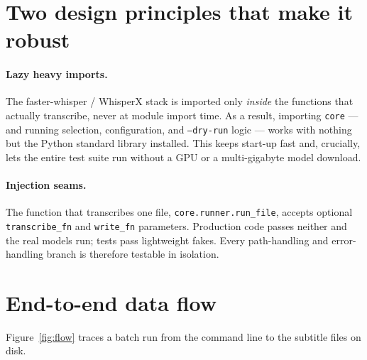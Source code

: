 \documentclass[11pt,a4paper]{report}
\newcommand{\code}[1]{\texttt{\small #1}}
\begin{document}
\section{Two design principles that make it robust}

\paragraph{Lazy heavy imports.} The faster-whisper / WhisperX stack is imported
only \emph{inside} the functions that actually transcribe, never at module import
time. As a result, importing \texttt{core} --- and running selection, configuration,
and \code{--dry-run} logic --- works with nothing but the Python standard library
installed. This keeps start-up fast and, crucially, lets the entire test suite run
without a GPU or a multi-gigabyte model download.

\paragraph{Injection seams.} The function that transcribes one file,
\code{core.runner.run\_file}, accepts optional \code{transcribe\_fn} and
\code{write\_fn} parameters. Production code passes neither and the real models
run; tests pass lightweight fakes. Every path-handling and error-handling branch
is therefore testable in isolation.

\section{End-to-end data flow}

Figure~\ref{fig:flow} traces a batch run from the command line to the subtitle
files on disk.
\end{document}
